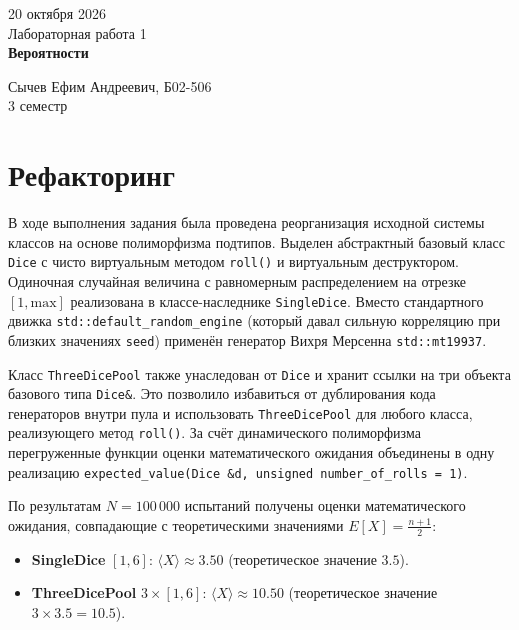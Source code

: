 \documentclass[12 pt, a4paper]{article}%
\title{}
\author{}
\date{}
\begin{document}
	\begin{titlepage} %
		\begin{center}
			\large 20 октября 2026\\
			\vspace{9.0cm}
			{\LARGE {Лабораторная работа 1\\
					\textbf{Вероятности}}\\}
			\vspace{9.5cm}
			
			\large Сычев Ефим Андреевич, Б02-506\\
			\large 3 семестр
		\end{center}
	\end{titlepage}
	
	\newpage
	
	
	\section{Рефакторинг}
	
	В ходе выполнения задания была проведена реорганизация исходной системы классов на основе полиморфизма подтипов. Выделен абстрактный базовый класс \texttt{Dice} с чисто виртуальным методом \texttt{roll()} и виртуальным деструктором. Одиночная случайная величина с равномерным распределением на отрезке $[1, \text{max}]$ реализована в классе-наследнике \texttt{SingleDice}. Вместо стандартного движка \texttt{std::default\_random\_engine} (который давал сильную корреляцию при близких значениях \texttt{seed}) применён генератор Вихря Мерсенна \texttt{std::mt19937}.
	
	Класс \texttt{ThreeDicePool} также унаследован от \texttt{Dice} и хранит ссылки на три объекта базового типа \texttt{Dice\&}. Это позволило избавиться от дублирования кода генераторов внутри пула и использовать \texttt{ThreeDicePool} для любого класса, реализующего метод \texttt{roll()}. За счёт динамического полиморфизма перегруженные функции оценки математического ожидания объединены в одну реализацию \texttt{expected\_value(Dice \&d, unsigned number\_of\_rolls = 1)}.
	
	По результатам $N = 100\,000$ испытаний получены оценки математического ожидания, совпадающие с теоретическими значениями $E[X] = \frac{n + 1}{2}$:
	
	\begin{itemize}
		\item \textbf{SingleDice} $[1, 6]$: $\langle X \rangle \approx 3.50$ (теоретическое значение $3.5$).
		\item \textbf{ThreeDicePool} $3 \times [1, 6]$: $\langle X \rangle \approx 10.50$ (теоретическое значение $3 \times 3.5 = 10.5$).
	\end{itemize}
	
\end{document}
